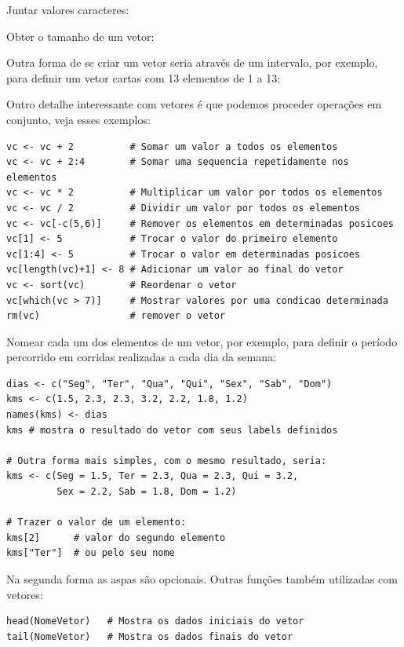 \documentclass[a4paper,11pt]{article}
\begin{document}
Juntar valores caracteres: \\

Obter o tamanho de um vetor: \\

Outra forma de se criar um vetor seria através de um intervalo, por exemplo, para definir um vetor cartas com 13 elementos de 1 a 13: \\

Outro detalhe interessante com vetores é que podemos proceder operações em 
conjunto, veja esses exemplos:
\begin{lstlisting}
vc <- vc + 2          # Somar um valor a todos os elementos
vc <- vc + 2:4        # Somar uma sequencia repetidamente nos elementos
vc <- vc * 2          # Multiplicar um valor por todos os elementos
vc <- vc / 2          # Dividir um valor por todos os elementos
vc <- vc[-c(5,6)]     # Remover os elementos em determinadas posicoes
vc[1] <- 5            # Trocar o valor do primeiro elemento
vc[1:4] <- 5          # Trocar o valor em determinadas posicoes
vc[length(vc)+1] <- 8 # Adicionar um valor ao final do vetor 
vc <- sort(vc)        # Reordenar o vetor
vc[which(vc > 7)]     # Mostrar valores por uma condicao determinada
rm(vc)                # remover o vetor
\end{lstlisting}

Nomear cada um dos elementos de um vetor, por exemplo, para definir o período percorrido em corridas realizadas a cada dia da semana:
\begin{lstlisting}
dias <- c("Seg", "Ter", "Qua", "Qui", "Sex", "Sab", "Dom")
kms <- c(1.5, 2.3, 2.3, 3.2, 2.2, 1.8, 1.2)
names(kms) <- dias
kms # mostra o resultado do vetor com seus labels definidos

# Outra forma mais simples, com o mesmo resultado, seria:
kms <- c(Seg = 1.5, Ter = 2.3, Qua = 2.3, Qui = 3.2, 
         Sex = 2.2, Sab = 1.8, Dom = 1.2)
         
# Trazer o valor de um elemento:
kms[2]      # valor do segundo elemento
kms["Ter"]  # ou pelo seu nome
\end{lstlisting}

Na segunda forma as aspas são opcionais. Outras funções também utilizadas com vetores:
\begin{lstlisting}
head(NomeVetor)   # Mostra os dados iniciais do vetor
tail(NomeVetor)   # Mostra os dados finais do vetor
\end{lstlisting}
\end{document}
